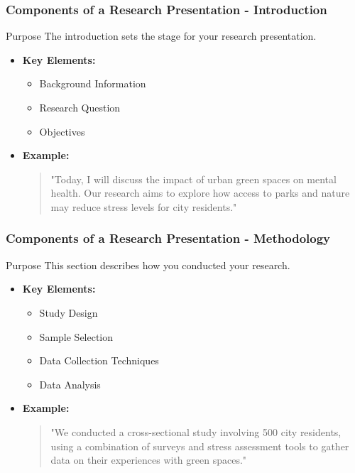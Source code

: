 \documentclass[aspectratio=169]{beamer}
\begin{document}
\begin{frame}[fragile]
    \frametitle{Components of a Research Presentation - Introduction}
    \begin{block}{Purpose}
        The introduction sets the stage for your research presentation.
    \end{block}
    \begin{itemize}
        \item \textbf{Key Elements:}
            \begin{itemize}
                \item Background Information
                \item Research Question
                \item Objectives
            \end{itemize}
        \item \textbf{Example:} 
            \begin{quote}
                "Today, I will discuss the impact of urban green spaces on mental health. Our research aims to explore how access to parks and nature may reduce stress levels for city residents."
            \end{quote}
    \end{itemize}
\end{frame}

\begin{frame}[fragile]
    \frametitle{Components of a Research Presentation - Methodology}
    \begin{block}{Purpose}
        This section describes how you conducted your research.
    \end{block}
    \begin{itemize}
        \item \textbf{Key Elements:}
            \begin{itemize}
                \item Study Design
                \item Sample Selection
                \item Data Collection Techniques
                \item Data Analysis
            \end{itemize}
        \item \textbf{Example:} 
            \begin{quote}
                "We conducted a cross-sectional study involving 500 city residents, using a combination of surveys and stress assessment tools to gather data on their experiences with green spaces."
            \end{quote}
    \end{itemize}
\end{frame}
\end{document}
